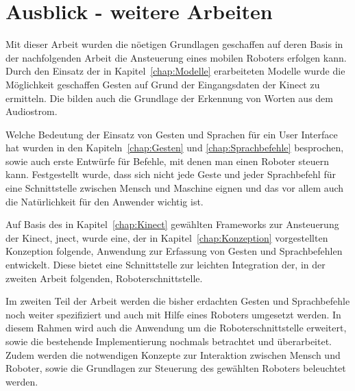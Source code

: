 \chapter{Ausblick - weitere Arbeiten}
\label{chap:Ausblick}

Mit dieser Arbeit wurden die n\"oetigen Grundlagen geschaffen auf deren Basis in der nachfolgenden Arbeit die Ansteuerung 
eines mobilen Roboters erfolgen kann. Durch den Einsatz der in Kapitel~\ref{chap:Modelle} erarbeiteten Modelle wurde die 
M\"oglichkeit geschaffen Gesten auf Grund der Eingangsdaten der Kinect zu ermitteln. Die 
bilden auch die Grundlage der Erkennung von Worten aus dem Audiostrom. 

Welche Bedeutung der Einsatz von Gesten und Sprachen f\"ur ein User Interface hat wurden in den Kapiteln~\ref{chap:Gesten} und 
\ref{chap:Sprachbefehle} besprochen, sowie auch erste Entw\"urfe f\"ur Befehle, mit denen man einen Roboter steuern kann.
Festgestellt wurde, dass sich nicht jede Geste und jeder Sprachbefehl f\"ur eine Schnittstelle zwischen Mensch und Maschine eignen
und das vor allem auch die Nat\"urlichkeit f\"ur den Anwender wichtig ist.

Auf Basis des in Kapitel~\ref{chap:Kinect} gew\"ahlten Frameworks zur Ansteuerung der Kinect, jnect, wurde eine, der in 
Kapitel~\ref{chap:Konzeption} vorgestellten Konzeption folgende, Anwendung zur Erfassung von Gesten und Sprachbefehlen entwickelt. 
Diese bietet eine Schnittstelle zur leichten Integration der, in der zweiten Arbeit folgenden, Roboterschnittstelle.

Im zweiten Teil der Arbeit werden die bisher erdachten Gesten und Sprachbefehle noch weiter spezifiziert und auch mit Hilfe
eines Roboters umgesetzt werden. In diesem Rahmen wird auch die Anwendung um die Roboterschnittstelle erweitert, sowie die
bestehende Implementierung nochmals betrachtet und überarbeitet. Zudem werden die notwendigen Konzepte zur Interaktion 
zwischen Mensch und Roboter, sowie die Grundlagen zur Steuerung des gew\"ahlten Roboters beleuchtet werden. %